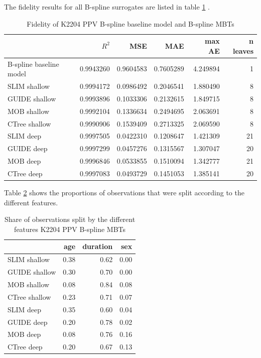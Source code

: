 The fidelity results for all B-spline surrogates are listed in table \ref{tab:ins_k2204_ppv_bsplines_surrogates_perf} .

\begin{table}

\centering \scriptsize
\begin{tabular}[t]{l|r|r|r|r|r}
\hline
  & $R^2$ & MSE & MAE & max AE & n leaves\\
\hline
B-spline baseline model & 0.9943260 & 0.9604583 & 0.7605289 & 4.249894 & 1\\
\hline
SLIM shallow & 0.9994172 & 0.0986492 & 0.2046541 & 1.880490 & 8\\
GUIDE shallow & 0.9993896 & 0.1033306 & 0.2132615 & 1.849715 & 8\\
MOB shallow & 0.9992104 & 0.1336634 & 0.2494695 & 2.063691 & 8\\
CTree shallow & 0.9990906 & 0.1539409 & 0.2713325 & 2.069590 & 8\\
\hline
SLIM deep & 0.9997505 & 0.0422310 & 0.1208647 & 1.421309 & 21\\
GUIDE deep & 0.9997299 & 0.0457276 & 0.1315567 & 1.307047 & 20\\
MOB deep & 0.9996846 & 0.0533855 & 0.1510094 & 1.342777 & 21\\
CTree deep & 0.9997083 & 0.0493729 & 0.1451053 & 1.385141 & 20\\
\hline
\end{tabular}
\label{tab:ins_k2204_ppv_bsplines_surrogates_perf}
\caption{Fidelity of K2204 PPV B-spline baseline model and  B-spline MBTs}
\end{table}





Table \ref{tab:ins_k2204_ppv_bsplines_surrogates_share}  shows the proportions of observations that were split according to the different features. 


\begin{table}[!htb]
\centering \scriptsize
\begin{tabular}[t]{l|r|r|r}
\hline
  & age & duration & sex\\
\hline
SLIM shallow & 0.38 & 0.62 & 0.00\\
GUIDE shallow & 0.30 & 0.70 & 0.00\\
MOB shallow & 0.08 & 0.84 & 0.08\\
CTree shallow & 0.23 & 0.71 & 0.07\\
\hline
SLIM deep & 0.35 & 0.60 & 0.04\\
GUIDE deep & 0.20 & 0.78 & 0.02\\
MOB deep & 0.08 & 0.76 & 0.16\\
CTree deep & 0.20 & 0.67 & 0.13\\
\hline
\end{tabular}
\label{tab:ins_k2204_ppv_bsplines_surrogates_share}
\caption{Share of observations split by the different features K2204 PPV B-spline MBTs}
\end{table}



